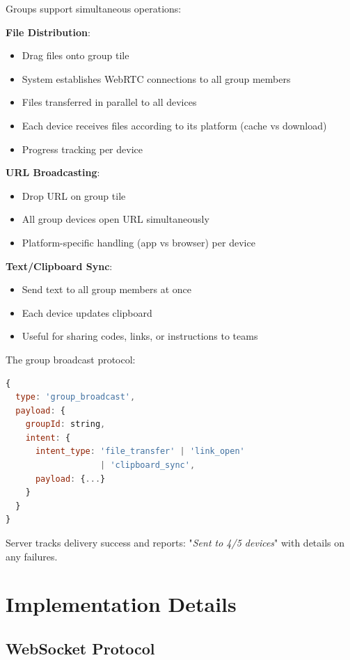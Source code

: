\documentclass[conference]{IEEEtran}
\begin{document}
Groups support simultaneous operations:

\textbf{File Distribution}:
\begin{itemize}
    \item Drag files onto group tile
    \item System establishes WebRTC connections to all group members
    \item Files transferred in parallel to all devices
    \item Each device receives files according to its platform (cache vs download)
    \item Progress tracking per device
\end{itemize}

\textbf{URL Broadcasting}:
\begin{itemize}
    \item Drop URL on group tile
    \item All group devices open URL simultaneously
    \item Platform-specific handling (app vs browser) per device
\end{itemize}

\textbf{Text/Clipboard Sync}:
\begin{itemize}
    \item Send text to all group members at once
    \item Each device updates clipboard
    \item Useful for sharing codes, links, or instructions to teams
\end{itemize}

The group broadcast protocol:

\begin{lstlisting}[language=JavaScript, basicstyle=\tiny]
{
  type: 'group_broadcast',
  payload: {
    groupId: string,
    intent: {
      intent_type: 'file_transfer' | 'link_open' 
                   | 'clipboard_sync',
      payload: {...}
    }
  }
}
\end{lstlisting}

Server tracks delivery success and reports: "\textit{Sent to 4/5 devices}" with details on any failures.

\section{Implementation Details}

\subsection{WebSocket Protocol}
\end{document}
